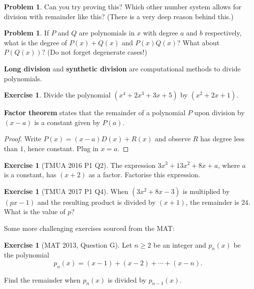 \documentclass[11pt]{article}
\theoremstyle{definition}
\newtheorem{example}[theorem]{Exercise}
\newtheorem{problem}[theorem]{Problem}
\theoremstyle{remark}
\newcommand{\pqty}[1]{\left(#1\right)}
\begin{document}
\begin{problem}\label{tmua-2-unit-001}
    Can you try proving this? Which other number system allows for division with remainder like this? (There is a very deep reason behind this.)
\end{problem}

\begin{problem}\label{tmua-2-unit-002}
    If \(P\) and \(Q\) are polynomials in \(x\) with degree \(a\) and \(b\) respectively, what is the degree of \(P\pqty{x} + Q\pqty{x}\) and \(P\pqty{x}Q\pqty{x}\)? What about \(P\pqty{Q\pqty{x}}\)? (Do not forget degenerate cases!)
\end{problem}

\textbf{Long division} and \textbf{synthetic division} are computational methods to divide polynomials.

\begin{example}\label{tmua-2-unit-003}
    Divide the polynomial \(\pqty{x^4 + 2 x^3 + 3x + 5}\) by \(\pqty{x^2 + 2x + 1}\).
\end{example}

\textbf{Factor theorem} states that the remainder of a polynomial \(P\) upon division by \(\pqty{x - a}\) is a constant given by \(P\pqty{a}\).

\begin{proof}\label{tmua-2-unit-004}
    Write \(P\pqty{x} = \pqty{x - a} D\pqty{x} + R\pqty{x}\) and observe \(R\) has degree less than \(1\), hence constant. Plug in \(x = a\).
\end{proof}

\begin{example}[TMUA 2016 P1 Q2]\label{tmua-2-unit-005}
    The expression \(3 x^3 + 13 x^2 + 8x + a\), where \(a\) is a constant, has \(\pqty{x + 2}\) as a factor. Factorise this expression.
\end{example}

\begin{example}[TMUA 2017 P1 Q4]\label{tmua-2-unit-006}
    When \(\pqty{3 x^2 + 8x - 3}\) is multiplied by \(\pqty{px - 1}\) and the resulting product is divided by \(\pqty{x + 1}\), the remainder is \(24\). What is the value of \(p\)?
\end{example}

Some more challenging exercises sourced from the MAT:

\begin{example}[MAT 2013, Question G]\label{tmua-2-unit-007}
    Let \(n \geq 2\) be an integer and \(p_n \pqty{x}\) be the polynomial
    \[
        p_n \pqty{x} = \pqty{x - 1} + \pqty{x - 2} + \cdots + \pqty{x - n}.
    \]

    Find the remainder when \(p_n \pqty{x}\) is divided by \(p_{n - 1} \pqty{x}\).
\end{example}
\end{document}
